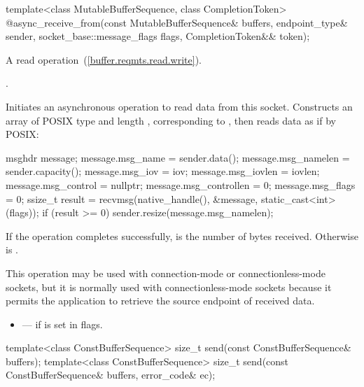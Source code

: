 \begin{itemdecl}
template<class MutableBufferSequence, class CompletionToken>
  @\DEDUCED@ async_receive_from(const MutableBufferSequence& buffers,
                             endpoint_type& sender,
                             socket_base::message_flags flags,
                             CompletionToken&& token);
\end{itemdecl}

\begin{itemdescr}
\pnum
A read operation~(\ref{buffer.reqmts.read.write}).

\pnum
\completionsig {}.

\pnum
\effects Initiates an asynchronous operation to read data from this socket. Constructs an array  of POSIX type  and length , corresponding to , then reads data as if by POSIX: 
\begin{codeblock}
msghdr message;
message.msg_name = sender.data();
message.msg_namelen = sender.capacity();
message.msg_iov = iov;
message.msg_iovlen = iovlen;
message.msg_control = nullptr;
message.msg_controllen = 0;
message.msg_flags = 0;
ssize_t result = recvmsg(native_handle(), &message, static_cast<int>(flags));
if (result >= 0)
  sender.resize(message.msg_namelen);
\end{codeblock}


\pnum
If the operation completes successfully,  is the number of bytes received. Otherwise  is .

\pnum
 \enternote This operation may be used with connection-mode or connectionless-mode sockets, but it is normally used with connectionless-mode sockets because it permits the application to retrieve the source endpoint of received data. \exitnote

\pnum
\errors
\begin{itemize}
\item
{} --- if  is set in flags.
\end{itemize}
\end{itemdescr}

\begin{itemdecl}
template<class ConstBufferSequence>
  size_t send(const ConstBufferSequence& buffers);
template<class ConstBufferSequence>
  size_t send(const ConstBufferSequence& buffers, error_code& ec);
\end{itemdecl}

